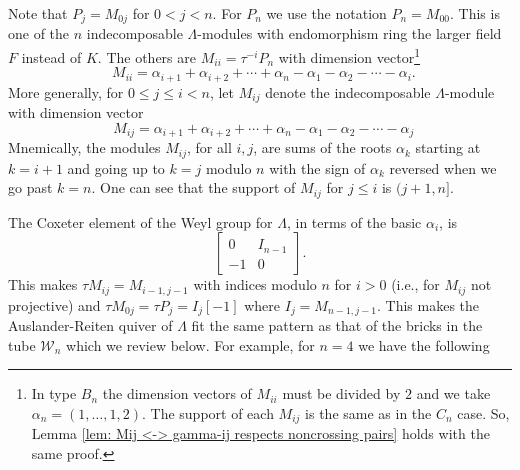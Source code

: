 \documentclass[11pt]{amsart}
\theoremstyle{definition}
\theoremstyle{remark}
\numberwithin{equation}{section}
\newcommand{\mat}[1]{\ensuremath{
\left[\begin{matrix}#1
\end{matrix}\right]
}}
\DeclareMathOperator{\undim}{\underline{dim}}
\newcommand{\cW}{\ensuremath{{\mathcal{W}}}}
\begin{document}
Note that $P_j=M_{0j}$ for $0<j<n$. For $P_n$ we use the notation $P_n=M_{00}$. This is one of the $n$ indecomposable $\Lambda$-modules with endomorphism ring the larger field $F$ instead of $K$. The others are $M_{ii}=\tau^{-i}P_n$ with dimension vector\footnote{In type $B_n$ the dimension vectors of $M_{ii}$ must be divided by $2$ and we take $\alpha_n=(1,\dots,1,2)$. The support of each $M_{ij}$ is the same as in the $C_n$ case. So, Lemma \ref{lem: Mij <-> gamma-ij respects noncrossing pairs} holds with the same proof.}
\[
	\undim M_{ii}=\alpha_{i+1}+\alpha_{i+2}+\cdots+\alpha_n-\alpha_1-\alpha_2-\cdots-\alpha_i.
\]
More generally, for $0\le j\le i<n$, let $M_{ij}$ denote the indecomposable $\Lambda$-module with dimension vector
\[
	\undim M_{ij}=\alpha_{i+1}+\alpha_{i+2}+\cdots+\alpha_n-\alpha_1-\alpha_2-\cdots-\alpha_j
\]
Mnemically, the modules $M_{ij}$, for all $i,j$, are sums of the roots $\alpha_k$ starting at $k=i+1$ and going up to $k=j$ modulo $n$ with the sign of $\alpha_k$ reversed when we go past $k=n$. One can see that the support of $M_{ij}$ for $j\le i$ is $(j+1,n]$.

The Coxeter element of the Weyl group for $\Lambda$, in terms of the basic $\alpha_i$, is
\[
	\mat{0 & I_{n-1} \\ -1 & 0}.
\]
This makes $\tau M_{ij}=M_{i-1,j-1}$ with indices modulo $n$ for $i>0$ (i.e., for $M_{ij}$ not projective) and $\tau M_{0j}=\tau P_j=I_j[-1]$ where $I_j=M_{n-1,j-1}$. This makes the Auslander-Reiten quiver of $\Lambda$ fit the same pattern as that of the bricks in the tube $\cW_n$ which we review below. For example, for $n=4$ we have the following
\end{document}
